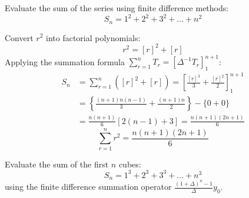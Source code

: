 \documentclass[11pt,a4paper]{article}
\begin{document}
\begin{exambox}
Evaluate the sum of the series using finite difference methods:
\begin{equation}
    S_n = 1^2 + 2^2 + 3^2 + \dots + n^2
\end{equation}
\end{exambox}

\begin{solbox}
Convert $r^2$ into factorial polynomials:
$$r^2 = [r]^2 + [r]$$
Applying the summation formula $\sum_{r=1}^n T_r = \left[ \Delta^{-1} T_r \right]_1^{n+1}$:
\begin{align*}
    S_n &= \sum_{r=1}^n \left( [r]^2 + [r] \right) = \left[ \frac{[r]^3}{3} + \frac{[r]^2}{2} \right]_1^{n+1} \\
    &= \left\{ \frac{(n+1)n(n-1)}{3} + \frac{(n+1)n}{2} \right\} - \{ 0 + 0 \} \\
    &= \frac{n(n+1)}{6} \left[ 2(n-1) + 3 \right] = \frac{n(n+1)(2n+1)}{6}
\end{align*}
\begin{equation}
    \boxed{\sum_{r=1}^n r^2 = \frac{n(n+1)(2n+1)}{6}}
\end{equation}
\end{solbox}

\begin{exambox}
Evaluate the sum of the first $n$ cubes:
\begin{equation}
    S_n = 1^3 + 2^3 + 3^3 + \dots + n^3
\end{equation}
using the finite difference summation operator $\frac{(1 + \Delta)^n - 1}{\Delta} y_0$.
\end{exambox}
\end{document}
